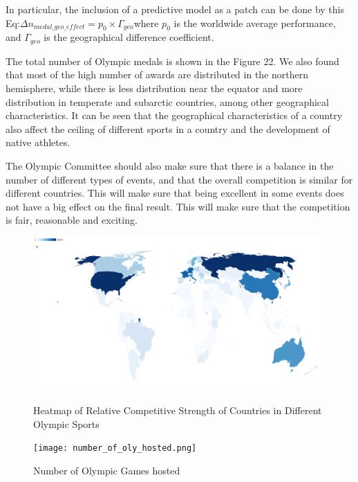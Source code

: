 \documentclass{mcmthesis}
\begin{document}
In particular, the inclusion of a predictive model as a patch can be done by this Eq:\(\Delta n_{medal\_geo\_effect} = p_0 \times \Gamma_{geo}\)where \(p_0\) is the worldwide average performance, and \(\Gamma_{geo}\) is the geographical difference coefficient.

The total number of Olympic medals is shown in the Figure 22. We also found that most of the high number of awards are distributed in the northern hemisphere, while there is less distribution near the equator and more distribution in temperate and subarctic countries, among other geographical characteristics. It can be seen that the geographical characteristics of a country also affect the ceiling of different sports in a country and the development of native athletes.

The Olympic Committee should also make sure that there is a balance in the number of different types of events, and that the overall competition is similar for different countries. This will make sure that being excellent in some events does not have a big effect on the final result. This will make sure that the competition is fair, reasonable and exciting.

\begin{figure}[htbp]
    \centering
    \begin{minipage}{0.48\textwidth}
        \centering
        \includegraphics[width=\linewidth]{MCM2025_Latex/figures/worldmap_colored.png}
        \caption{Heatmap of Relative Competitive Strength of Countries in Different Olympic Sports}
        \label{fig:worldmap}
    \end{minipage}
    \hfill
    \begin{minipage}{0.48\textwidth}
        \centering
        \texttt{[image: number\_of\_oly\_hosted.png]}
        \caption{Number of Olympic Games hosted}
        \label{fig:number_of_oly_hosted}
    \end{minipage}
\end{figure}
\end{document}
